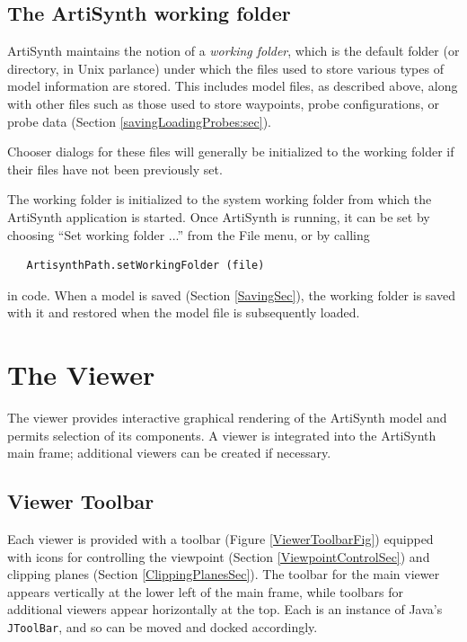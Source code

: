 \documentclass{article}
\begin{document}
\subsection{The ArtiSynth working folder}
\label{workingDir:sec}

ArtiSynth maintains the notion of a {\it working folder}, which is
the default folder (or directory, in Unix parlance) under which the
files used to store various types of model information are stored.
This includes model files, as described above, along with other files
such as those used to store waypoints, probe configurations, or probe
data (Section \ref{savingLoadingProbes:sec}).

Chooser dialogs for these files will generally be initialized to the
working folder if their files have not been previously set.

The working folder is initialized to the system working folder from
which the ArtiSynth application is started. Once ArtiSynth is running,
it can be set by choosing {\sf ``Set working folder ...''} from the
{\sf File} menu, or by calling
\begin{verbatim}
   ArtisynthPath.setWorkingFolder (file)
\end{verbatim}
in code. When a model is saved (Section \ref{SavingSec}), the working
folder is saved with it and restored when the model file is
subsequently loaded.

\section{The Viewer}

The viewer provides interactive graphical rendering of the ArtiSynth
model and permits selection of its components. A viewer is integrated
into the ArtiSynth main frame; additional viewers can be created
if necessary.

\subsection{Viewer Toolbar}

Each viewer is provided with a toolbar (Figure \ref{ViewerToolbarFig}) equipped
with icons for controlling the viewpoint (Section \ref{ViewpointControlSec}) and
clipping planes (Section \ref{ClippingPlanesSec}). The toolbar for the main viewer
appears vertically at the lower left of the main frame, while toolbars
for additional viewers appear horizontally at the top.  Each is an
instance of Java's {\tt JToolBar}, and so can be moved and docked
accordingly.
\end{document}

